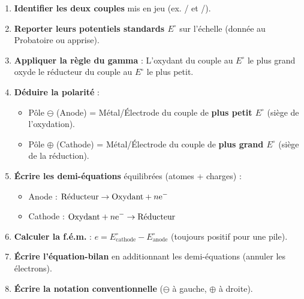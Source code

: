 \documentclass[11pt]{article}
\begin{document}
\begin{methode}
\begin{enumerate}
  \item \textbf{Identifier les deux couples} mis en jeu (ex. / et /).
  \item \textbf{Reporter leurs potentiels standards $E^\circ$} sur l'échelle (donnée au Probatoire ou apprise).
  \item \textbf{Appliquer la règle du gamma} : L'oxydant du couple au $E^\circ$ le plus grand oxyde le réducteur du couple au $E^\circ$ le plus petit.
  \item \textbf{Déduire la polarité} :
        \begin{itemize}
          \item Pôle $\ominus$ (Anode) = Métal/Électrode du couple de \textbf{plus petit $E^\circ$} (siège de l'oxydation).
          \item Pôle $\oplus$ (Cathode) = Métal/Électrode du couple de \textbf{plus grand $E^\circ$} (siège de la réduction).
        \end{itemize}
  \item \textbf{Écrire les demi-équations} équilibrées (atomes + charges) :
        \begin{itemize}
          \item Anode : $\text{Réducteur} \to \text{Oxydant} + n\ce{e-}$
          \item Cathode : $\text{Oxydant} + n\ce{e-} \to \text{Réducteur}$
        \end{itemize}
  \item \textbf{Calculer la f.é.m.} : $e = E^\circ_{\text{cathode}} - E^\circ_{\text{anode}}$ (toujours positif pour une pile).
  \item \textbf{Écrire l'équation-bilan} en additionnant les demi-équations (annuler les électrons).
  \item \textbf{Écrire la notation conventionnelle} ($\ominus$ à gauche, $\oplus$ à droite).
\end{enumerate}
\end{methode}
\end{document}
